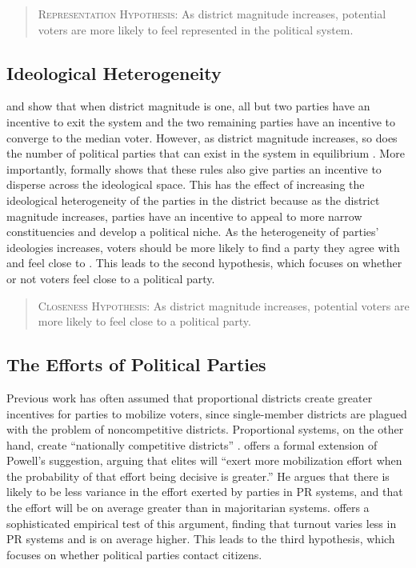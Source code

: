 \documentclass[12pt]{article}
\begin{document}
\begin{quote}
        \textsc{Representation Hypothesis:} As district magnitude increases, potential voters are more likely to feel represented in the political system.
\end{quote}

\subsection*{Ideological Heterogeneity}

\cite{Downs1957} and \cite{Cox1999b} show that when district magnitude is one, all but two parties have an incentive to exit the system and the two remaining parties have an incentive to converge to the median voter. However, as district magnitude increases, so does the number of political parties that can exist in the system in equilibrium \citep{Cox1997, Cox1999, ClarkGolder2006}. More importantly, \cite{Cox1990} formally shows that these rules also give parties an incentive to disperse across the ideological space. This has the effect of increasing the ideological heterogeneity of the parties in the district because as the district magnitude increases, parties have an incentive to appeal to more narrow constituencies and develop a political niche. As the heterogeneity of parties' ideologies increases, voters should be more likely to find a party they agree with and feel close to \citep{Bowleretal1994}. This leads to the second hypothesis, which focuses on whether or not voters feel close to a political party.

\begin{quote}
        \textsc{Closeness Hypothesis:} As district magnitude increases, potential voters are more likely to feel close to a political party.
\end{quote}

\subsection*{The Efforts of Political Parties}

Previous work has often assumed that proportional districts create greater incentives for parties to mobilize voters, since single-member districts are plagued with the problem of noncompetitive districts. Proportional systems, on the other hand, create ``nationally competitive districts'' \citep[though see \citealt{Rainey2015}]{Powell1982}. \cite{Cox1999} offers a formal extension of Powell's suggestion, arguing that elites will ``exert more mobilization effort when the probability of that effort being decisive is greater.'' He argues that there is likely to be less variance in the effort exerted by parties in PR systems, and that the effort will be on average greater than in majoritarian systems. \cite{Selb2009} offers a sophisticated empirical test of this argument, finding that turnout varies less in PR systems and is on average higher. This leads to the third hypothesis, which focuses on whether political parties contact citizens.
\end{document}
